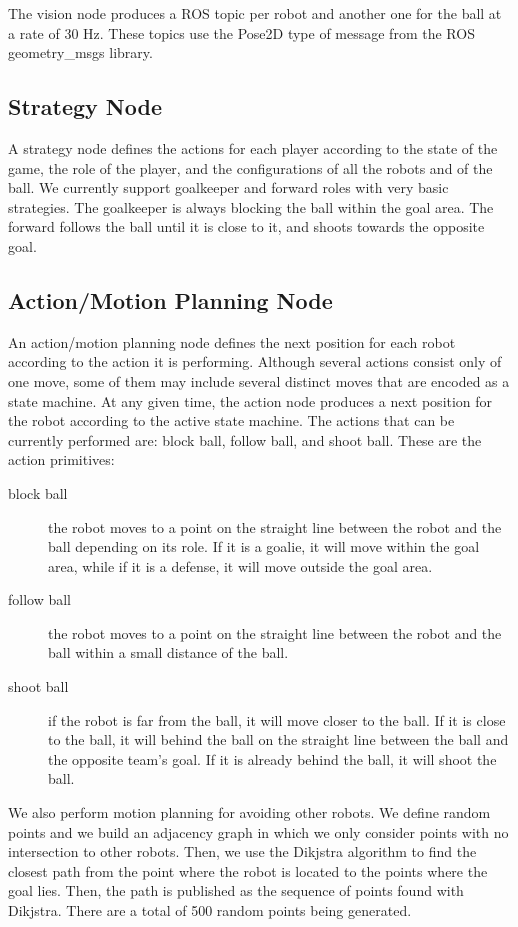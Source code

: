 \documentclass[]{llncs}
\newcommand{\TODO}[1]{{\textcolor{blue}{ToDo: {#1}}}}
\begin{document}
The vision node produces a ROS topic per robot and another one for the ball at a rate of 30 Hz. These topics use the Pose2D type of message from the ROS geometry\_msgs library. 


\subsection{Strategy Node}
A strategy node defines the actions for each player according to the state of the game, the role of the player, and the configurations of all the robots and of the ball. We currently support goalkeeper and forward roles with very basic strategies. The goalkeeper is always blocking the ball within the goal area. The forward follows the ball until it is close to it, and shoots towards the opposite goal.

\subsection{Action/Motion Planning Node}
An action/motion planning node defines the next position for each robot according to the action it is performing. Although several actions consist only of one move, some of them may include several distinct moves that are encoded as a state machine. At any given time, the action node produces a next position for the robot according to the active state machine. The actions that can be currently performed are: block ball, follow ball, and shoot ball. These are the action primitives:

\begin{description}
	\item[block ball] the robot moves to a point on the straight line between the robot and the ball depending on its role. If it is a goalie, it will move within the goal area, while if it is a defense, it will move outside the goal area.
	\item[follow ball] the robot moves to a point on the straight line between the robot and the ball within a small distance of the ball.
	\item[shoot ball] if the robot is far from the ball, it will move closer to the ball. If it is close to the ball, it will behind the ball on the straight line between the ball and the opposite team's goal. If it is already behind the ball, it will shoot the ball.
\end{description}

We also perform motion planning for avoiding other robots. We define random points and we build an adjacency graph in which we only consider points with no intersection to other robots. Then, we use the Dikjstra algorithm to find the closest path from the point where the robot is located to the points where the goal lies. Then, the path is published as the sequence of points found with Dikjstra. There are a total of 500 random points being generated.
\end{document}
